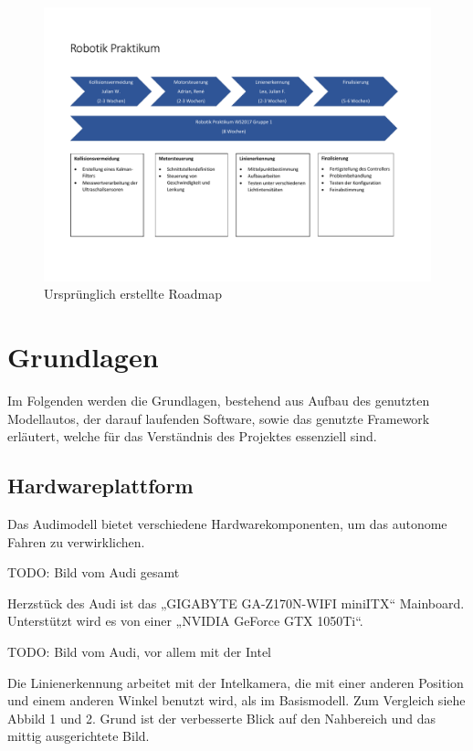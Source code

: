 \documentclass[12pt,a4paper]{report}
\begin{document}
\begin{figure}
\centering
\includegraphics[width=\textwidth, height=\textheight, keepaspectratio]{Bilder/Roadmap_Gr1.pdf}
\caption{Ursprünglich erstellte Roadmap}
\label{img_Roadmap_Gr1}
\end{figure}

\chapter{Grundlagen}

Im Folgenden werden die Grundlagen, bestehend aus Aufbau des genutzten Modellautos, der darauf laufenden Software, sowie das genutzte Framework erläutert, welche für das Verständnis des Projektes essenziell sind.

\section{Hardwareplattform}

Das Audimodell bietet verschiedene Hardwarekomponenten, um das autonome Fahren zu verwirklichen.

TODO: Bild vom Audi gesamt

Herzstück des Audi ist das „GIGABYTE GA-Z170N-WIFI miniITX“ Mainboard. Unterstützt wird es von einer „NVIDIA GeForce GTX 1050Ti“. 

TODO: Bild vom Audi, vor allem mit der Intel 

Die Linienerkennung arbeitet mit der Intelkamera, die mit einer anderen Position und einem anderen Winkel benutzt wird, als im 
Basismodell. Zum Vergleich siehe Abbild 1 und 2. Grund ist der verbesserte Blick auf den Nahbereich und das mittig ausgerichtete Bild.
\end{document}
